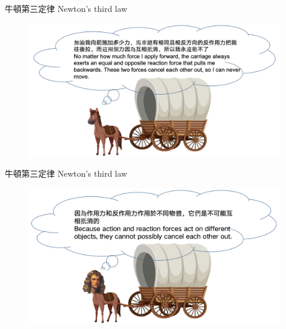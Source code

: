 \documentclass[beamer=true]{standalone}
\begin{document}
\begin{frame}{牛頓第三定律 Newton's third law}
    \begin{figure}[h!]
        \centering
        \includegraphics[width=\textwidth]{assets/4b5ef98a.png}
    \end{figure}
\end{frame}
\begin{frame}{牛頓第三定律 Newton's third law}
    \begin{figure}[h!]
        \centering
        \includegraphics[width=\textwidth]{assets/9334d132.png}
    \end{figure}
\end{frame}
\end{document}
